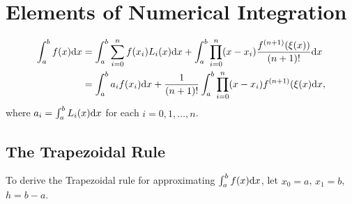 \section{Elements of Numerical Integration}
\begin{align*}
    \int_a^bf(x)\mathrm{d} x &= \int_a^b\sum_{i=0}^nf(x_i)L_i(x)\mathrm{d} x + \int_a^b\prod_{i=0}^n(x-x_i)\frac{f^{(n+1)}(\xi(x))}{(n+1)!}\mathrm{d} x \\
    &= \int_a^ba_if(x_i)\mathrm{d} x + \frac{1}{(n+1)!}\int_a^b\prod_{i=0}^n(x-x_i)f^{(n+1)}(\xi(x)\mathrm{d} x,
\end{align*}
where $a_i=\int_a^bL_i(x)\mathrm{d} x$ for each $i=0,1,\ldots,n$.

\subsection{The Trapezoidal Rule}
To derive the Trapezoidal rule for approximating $\int_a^bf(x)\mathrm{d} x$, let $x_0=a$, $x_1=b$, $h=b-a$.
